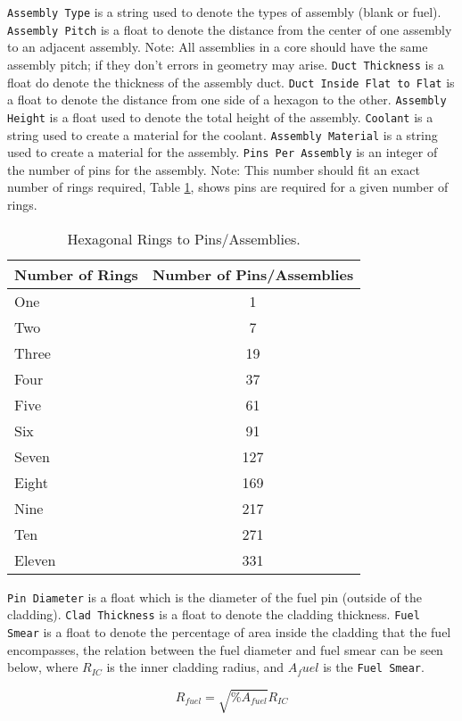 \documentclass{article}
\begin{document}
\verb|Assembly Type| is a string used to denote the types of assembly (blank or fuel). \verb|Assembly Pitch| is a float to denote the distance from the center of one assembly to an adjacent assembly. Note: All assemblies in a core should have the same assembly pitch; if they don't errors in geometry may arise. \verb|Duct Thickness| is a float do denote the thickness of the assembly duct. \verb|Duct Inside Flat to Flat| is a float to denote the distance from one side of a hexagon to the other. \verb|Assembly Height| is a float used to denote the total height of the assembly. \verb|Coolant| is a string used to create a material for the coolant. \verb|Assembly Material| is a string used to create a material for the assembly. \verb|Pins Per Assembly| is an integer of the number of pins for the assembly. Note: This number should fit an exact number of rings required, Table \ref{tab:rings}, shows pins are required for a given number of rings.

\begin{table}
	\centering
	\caption{Hexagonal Rings to Pins/Assemblies.}
	\begin{tabular}{lc}\toprule
		Number of Rings & Number of Pins/Assemblies 
		\\
		\hline
		One  & 1 
		\\
		Two & 7
		\\
		Three & 19 
		\\
		Four & 37
		\\
		Five & 61 
		\\
		Six & 91
		\\
		Seven & 127
		\\
	    Eight & 169
		\\
		Nine & 217 
		\\
		Ten & 271
		\\
		Eleven & 331
		\\		
		\bottomrule
	\end{tabular}
	\label{tab:rings}
\end{table}

\verb|Pin Diameter| is a float which is the diameter of the fuel pin (outside of the cladding). \verb|Clad Thickness| is a float to denote the cladding thickness. \verb|Fuel Smear| is a float to denote the percentage of area inside the cladding that the fuel encompasses, the relation between the fuel diameter and fuel smear can be seen below, where $R_{IC}$ is the inner cladding radius, and $A_fuel$ is the \verb|Fuel Smear|.

\begin{equation}
    R_{fuel} = \sqrt{\%A_{fuel}}R_{IC}
\end{equation}
\end{document}
